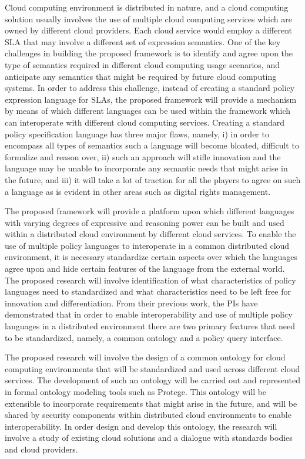 \documentclass[10pt, conference, compsocconf]{IEEEtran}
\begin{document}
Cloud computing environment is distributed in nature, and a cloud computing solution usually involves the use of multiple cloud computing services which are owned by different cloud providers. Each cloud service would employ a different SLA that may involve a different set of expression semantics. One of the key challenges in building the proposed framework is to identify and agree upon the type of semantics required in different cloud computing usage scenarios, and anticipate any semantics that might be required by future cloud computing systems. In order to address this challenge, instead of creating a standard policy expression language for SLAs, the proposed framework will provide a mechanism by means of which different languages can be used within the framework which can interoperate with different cloud computing services. Creating a standard policy specification language has three major flaws, namely, i)  in order to encompass all types of semantics such a language will become bloated, difficult to formalize and reason over, ii) such an approach will stifle innovation and  the language may be unable to incorporate any semantic needs that might arise in the future, and iii) it will take a lot of traction for all the players to agree on such a language as is evident in other areas such as digital rights management.

The proposed framework will provide a platform upon which different languages with varying degrees of expressive and reasoning power can be built and used within a distributed cloud environment by different cloud services.  To enable the use of multiple policy languages to interoperate in a common distributed cloud environment, it is necessary standardize certain aspects over which the languages agree upon and hide certain features of the language from the external world. The proposed research will involve identification of what characteristics of policy languages need to standardized and what characteristics need to be left free for innovation and differentiation. From their previous work, the PIs have demonstrated that in order to enable interoperability and use of multiple policy languages in a distributed environment there are two primary features that need to be standardized, namely, a common ontology and a policy query interface.

The proposed research will  involve the design of a common ontology for cloud computing environments that will be standardized and used across different cloud services. The development of such an ontology will be carried out and represented in formal ontology modeling tools such as Protege. This ontology will be extensible to incorporate requirements that might arise in the future, and will be shared by security components within distributed cloud environments to enable interoperability. In order design and develop this ontology, the research will involve a study of existing cloud solutions and a dialogue with standards bodies and cloud providers.
\end{document}

